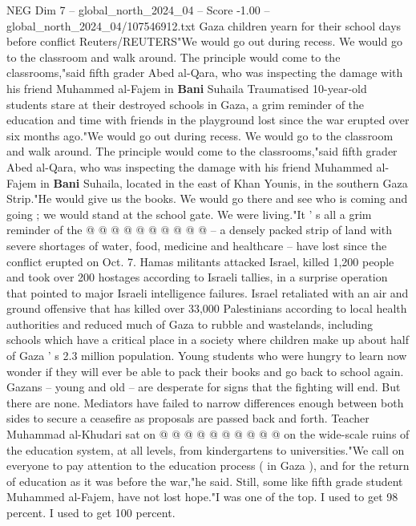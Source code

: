 \begin{textsample}{NEG Dim 7 – global\_north\_2024\_04 – Score -1.00 – global\_north\_2024\_04/107546912.txt}  \label{ex:f7_neg_386}
Gaza children yearn for their school days before conflict Reuters/REUTERS"We would go out during recess.
We would go to the classroom and walk around.
The principle would come to the classrooms,"said fifth grader Abed al-Qara, who was inspecting the damage with his friend Muhammed al-Fajem in \textbf{Bani} Suhaila Traumatised 10-year-old students stare at their destroyed schools in Gaza, a grim reminder of the education and time with friends in the playground lost since the war erupted over six months ago."We would go out during recess.
We would go to the classroom and walk around.
The principle would come to the classrooms,"said fifth grader Abed al-Qara, who was inspecting the damage with his friend Muhammed al-Fajem in \textbf{Bani} Suhaila, located in the east of Khan Younis, in the southern Gaza Strip."He would give us the books.
We would go there and see who is coming and going ; we would stand at the school gate.
We were living."It ' s all a grim reminder of the @ @ @ @ @ @ @ @ @ @ -- a densely packed strip of land with severe shortages of water, food, medicine and healthcare -- have lost since the conflict erupted on Oct. 7.
Hamas militants attacked Israel, killed 1,200 people and took over 200 hostages according to Israeli tallies, in a surprise operation that pointed to major Israeli intelligence failures.
Israel retaliated with an air and ground offensive that has killed over 33,000 Palestinians according to local health authorities and reduced much of Gaza to rubble and wastelands, including schools which have a critical place in a society where children make up about half of Gaza ' s 2.3 million population.
Young students who were hungry to learn now wonder if they will ever be able to pack their books and go back to school again.
Gazans -- young and old -- are desperate for signs that the fighting will end.
But there are none.
Mediators have failed to narrow differences enough between both sides to secure a ceasefire as proposals are passed back and forth.
Teacher Muhammad al-Khudari sat on @ @ @ @ @ @ @ @ @ @ on the wide-scale ruins of the education system, at all levels, from kindergartens to universities."We call on everyone to pay attention to the education process ( in Gaza ), and for the return of education as it was before the war,"he said.
Still, some like fifth grade student Muhammed al-Fajem, have not lost hope."I was one of the top.
I used to get 98 percent.
I used to get 100 percent.

\end{textsample}
